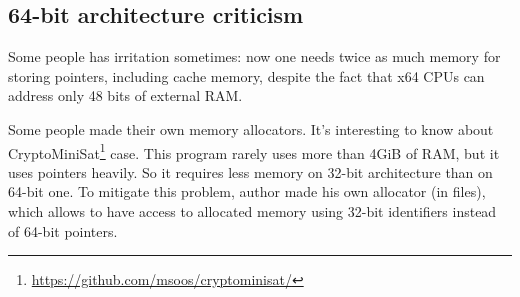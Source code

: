 \subsection{64-bit architecture criticism}

Some people has irritation sometimes: now one needs twice as much memory for storing pointers,
including cache memory, despite the fact that x64 \ac{CPU}s can address only 48 bits of external 
\ac{RAM}.

Some people made their own memory allocators.
It's interesting to know about CryptoMiniSat\footnote{\url{https://github.com/msoos/cryptominisat/}} case.
This program rarely uses more than 4GiB of \ac{RAM}, but it uses pointers heavily.
So it requires less memory on 32-bit architecture than on 64-bit one.
To mitigate this problem, author made his own allocator (in  files),
which allows to have access to allocated memory using 32-bit identifiers instead of 64-bit pointers.

